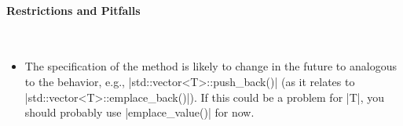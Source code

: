 \paragraph{Restrictions and Pitfalls}\mbox{}\\
\begin{itemize}
  \item The specification of the method is likely to change in the future to
  analogous to the behavior, e.g., |std::vector<T>::push_back()| (as it
  relates to |std::vector<T>::emplace_back()|).  If this could be a
  problem for |T|, you should probably use |emplace_value()| for now.
\end{itemize}




